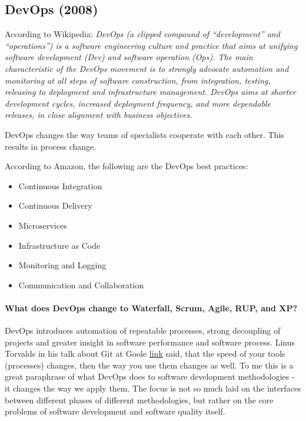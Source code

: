\subsection{DevOps (2008)}\label{devops}

According to Wikipedia: \emph{DevOps (a clipped compound of
``development'' and ``operations'') is a software engineering culture
and practice that aims at unifying software development (Dev) and
software operation (Ops). The main characteristic of the DevOps movement
is to strongly advocate automation and monitoring at all steps of
software construction, from integration, testing, releasing to
deployment and infrastructure management. DevOps aims at shorter
development cycles, increased deployment frequency, and more dependable
releases, in close alignment with business objectives.}\cite{wiki:DevOps}

DevOps changes the way teams of specialists cooperate with each other.
This results in process change.

According to Amazon\cite{aws-devops}, the following are the DevOps best practices:

\begin{itemize}

\item
  Continuous Integration
\item
  Continuous Delivery
\item
  Microservices
\item
  Infrastructure as Code
\item
  Monitoring and Logging
\item
  Communication and Collaboration
\end{itemize}

\paragraph{What does DevOps change to Waterfall, Scrum, Agile, RUP, and
XP?}

DevOps introduces automation of repeatable processes, strong decoupling of projects and greater insight in software performance and software process. Linus Torvalds in his talk about Git at Goole \href{https://www.youtube.com/watch?v=4XpnKHJAok8}{link} said, that the speed of your tools (processes) changes, then the way you use them
changes as well. To me this is a great paraphrase of what DevOps does to software development methodologies - it changes the way we apply them. The focus is not so much laid on the interfaces between different phases of different methodologies, but rather on the core problems of software development and software quality itself.

